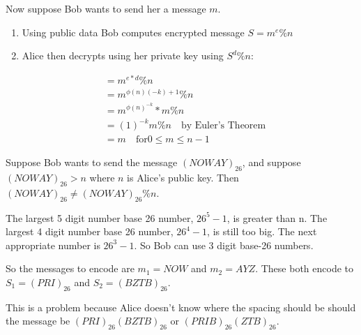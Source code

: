  Now suppose Bob wants to send her a message $m$.
 
 \begin{enumerate}
 \item Using public data Bob computes encrypted message $ S = m^e \% n$
 \item Alice then decrypts using her private key using $S^d \% n $:
 \end{enumerate}

 \begin{align}
  &= m^{e*d} \% n \\
  &= m^{ \phi (n) (-k) + 1} \% n \\
  &= m^{ \phi (n)^{-k}} * m \% n \\
  &= (1)^{-k} m \% n  \quad \text{by Euler's Theorem} \\
  &= m \quad \text{for} 0 \leq m \leq n -1
 \end{align}

 
 
 \begin{example}
 Suppose Bob wants to send the message $ (NOWAY)_{26}$, and suppose $ (NOWAY)_{26} > n$ where $n$ is Alice's public key. Then $(NOWAY)_{26} \neq  (NOWAY)_{26} \% n$.
 
 The largest 5 digit number base 26 number, $ 26^5 -1$, is greater than n. The largest 4 digit number base 26 number, $ 26^4 -1$, is still too big. The next appropriate number is $ 26^3 -1$. So Bob can use 3 digit base-26 numbers.
 
 So the messages to encode are $m_1 = NOW$ and $ m_2 = AYZ$. These both encode to $ S_1 = (PRI)_{26}$ and $ S_2 = (BZTB)_{26}$.
 
 This is a problem because Alice doesn't know where the spacing should be should the message be $(PRI)_{26} (BZTB)_{26}$ or $(PRIB)_{26} (ZTB)_{26}$. 
 
 
 
 \end{example}